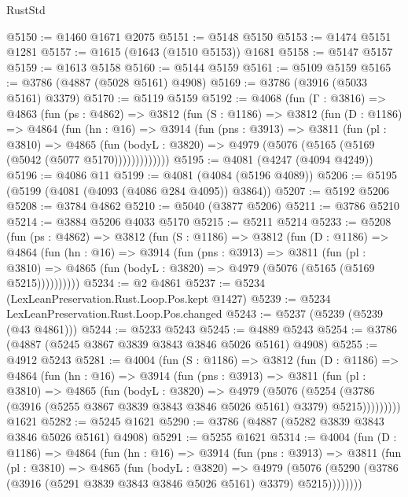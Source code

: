 \begin{lexlean}{RustStd}
\begin{coremodule}
@5150 := @1460 @1671 @2075
@5151 := @5148 @5150
@5153 := @1474 @5151 @1281
@5157 := @1615 (@1643 (@1510 @5153)) @1681
@5158 := @5147 @5157
@5159 := @1613 @5158
@5160 := @5144 @5159
@5161 := @5109 @5159
@5165 := @3786 (@4887 (@5028 @5161) @4908)
@5169 := @3786 (@3916 (@5033 @5161) @3379)
@5170 := @5119 @5159
@5192 := @4068
    (fun (Γ : @3816) =>
    @4863
      (fun (ps : @4862) =>
      @3812
        (fun (S : @1186) =>
        @3812
          (fun (D : @1186) =>
          @4864
            (fun (hn : @16) =>
            @3914
              (fun (pns : @3913) =>
              @3811
                (fun (pl : @3810) =>
                @4865
                  (fun (bodyL : @3820) =>
                  @4979 (@5076 (@5165 (@5169 (@5042 (@5077 @5170)))))))))))))
@5195 := @4081 (@4247 (@4094 @4249))
@5196 := @4086 @11
@5199 := @4081 (@4084 (@5196 @4089))
@5206 := @5195 (@5199 (@4081 (@4093 (@4086 @284 @4095)) @3864))
@5207 := @5192 @5206
@5208 := @3784 @4862
@5210 := @5040 (@3877 @5206)
@5211 := @3786 @5210
@5214 := @3884 @5206 @4033 @5170
@5215 := @5211 @5214
@5233 := @5208
    (fun (ps : @4862) =>
    @3812
      (fun (S : @1186) =>
      @3812
        (fun (D : @1186) =>
        @4864
          (fun (hn : @16) =>
          @3914
            (fun (pns : @3913) =>
            @3811
              (fun (pl : @3810) =>
              @4865 (fun (bodyL : @3820) => @4979 (@5076 (@5165 (@5169 @5215))))))))))
@5234 := @2 @4861
@5237 := @5234 (LexLeanPreservation.Rust.Loop.Pos.kept @1427)
@5239 := @5234 LexLeanPreservation.Rust.Loop.Pos.changed
@5243 := @5237 (@5239 (@5239 (@43 @4861)))
@5244 := @5233 @5243
@5245 := @4889 @5243
@5254 := @3786 (@4887 (@5245 @3867 @3839 @3843 @3846 @5026 @5161) @4908)
@5255 := @4912 @5243
@5281 := @4004
    (fun (S : @1186) =>
    @3812
      (fun (D : @1186) =>
      @4864
        (fun (hn : @16) =>
        @3914
          (fun (pns : @3913) =>
          @3811
            (fun (pl : @3810) =>
            @4865
              (fun (bodyL : @3820) =>
              @4979
                (@5076
                  (@5254
                    (@3786 (@3916 (@5255 @3867 @3839 @3843 @3846 @5026 @5161) @3379) @5215)))))))))
    @1621
@5282 := @5245 @1621
@5290 := @3786 (@4887 (@5282 @3839 @3843 @3846 @5026 @5161) @4908)
@5291 := @5255 @1621
@5314 := @4004
    (fun (D : @1186) =>
    @4864
      (fun (hn : @16) =>
      @3914
        (fun (pns : @3913) =>
        @3811
          (fun (pl : @3810) =>
          @4865
            (fun (bodyL : @3820) =>
            @4979
              (@5076 (@5290 (@3786 (@3916 (@5291 @3839 @3843 @3846 @5026 @5161) @3379) @5215))))))))

\end{coremodule}
\end{lexlean}
